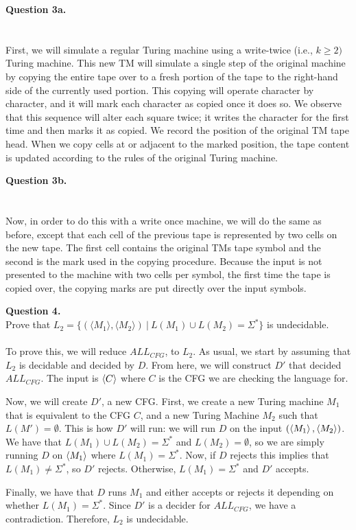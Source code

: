 \documentclass{article}
\newenvironment{question}[2]
{
    {\large \textbf{Question #1.}}\\
    #2\\\\
}{\newpage}
\begin{document}
\begin{question}
    {3a}
    {}

    First, we will simulate a regular Turing machine using a write-twice (i.e., $k \geq 2)$ Turing machine. This new TM will simulate a single step of the
    original machine by copying the entire tape over to a fresh portion of the tape to the right-hand side of the currently used portion. This copying
    will operate character by character, and it will mark each character as copied once it does so. We observe that this sequence will alter each square
    twice; it writes the character for the first time and then marks it as copied. We record the position of the original TM tape head.
    When we copy cells at or adjacent to the marked position, the tape content is updated according to the rules of the original Turing machine.
\end{question}

\begin{question}
    {3b}
    {}
    Now, in order to do this with a write once machine, we will do the same as before, except that each cell of the previous tape is represented by two cells
    on the new tape. The first cell contains the original TMs tape symbol and the second is the mark used in the copying procedure. Because the input
    is not presented to the machine with two cells per symbol, the first time the tape is copied over, the copying marks are put directly over the input symbols.
\end{question}

\begin{question}
    {4}
    {Prove that $L_2 = \{(\langle M_1\rangle, \langle M_2\rangle)\ |\
            L(M_1) \cup L(M_2) = \Sigma^*\}$ is undecidable.}

    To prove this, we will reduce $ALL_{CFG}$, to $L_2$. As usual, we start by assuming that $L_2$ is decidable and decided by $D$. From here, we will
    construct $D'$ that decided $ALL_{CFG}$. The input is $\braket{C}$ where $C$ is the CFG we are checking the language for.

    Now, we will create $D'$, a new CFG. First, we create a new Turing machine $M_1$ that is equivalent to the CFG $C$, and a new Turing Machine $M_2$ such
    that $L(M') = \emptyset$. This is how $D'$ will run: we will run $D$ on the input $(\braket{M_1}, \braket{M_2})$. We have that
    $L(M_1) \cup L(M_2) = \Sigma^*$ and $L(M_2) = \emptyset$, so we are simply running $D$ on $\braket{M_1}$ where $L(M_1) = \Sigma^*$. Now, if
    $D$ rejects this implies that $L(M_1) \neq \Sigma^*$, so $D'$ rejects. Otherwise, $L(M_1) = \Sigma^*$ and $D'$ accepts.

    Finally, we have that $D$ runs $M_1$ and either accepts or rejects it depending on whether $L(M_1) = \Sigma^*$. Since $D'$ is a decider
    for $ALL_{CFG}$, we have a contradiction. Therefore, $L_2$ is undecidable.
\end{question}
\end{document}

